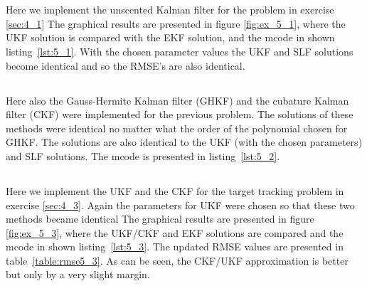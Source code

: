 \documentclass[a4paper,oneside,article]{memoir}
\begin{document}
\clearpage




\section{}

\subsection{}\label{sec:5_1}

Here we implement the unscented Kalman filter for the problem in exercise \ref{sec:4_1}
The graphical results are presented in figure \ref{fig:ex_5_1}, where the UKF solution
is compared with the EKF solution, and the mcode in shown listing~\ref{lst:5_1}. With
the chosen parameter values the UKF and SLF solutions become identical and so the RMSE's
are also identical.



\clearpage






\subsection{}\label{sec:5_2}

Here also the Gauss-Hermite Kalman filter (GHKF) and the cubature Kalman filter (CKF)
were implemented for the previous problem. The solutions of these methods were
identical no matter what the order of the polynomial chosen for GHKF. The solutions
are also identical to the UKF (with the chosen parameters) and SLF solutions. The mcode
is presented in listing~\ref{lst:5_2}.




\subsection{}\label{sec:5_3}

Here we implement the UKF and the CKF for the target tracking problem in exercise \ref{sec:4_3}.
Again the parameters for UKF were chosen so that these two methods became identical
The graphical results are presented in figure \ref{fig:ex_5_3}, where the UKF/CKF and EKF solutions
are compared and the mcode in shown listing~\ref{lst:5_3}. The updated RMSE values are presented
in table~\ref{table:rmse5_3}. As can be seen, the CKF/UKF approximation is better but only by a very
slight margin. 
\end{document}
